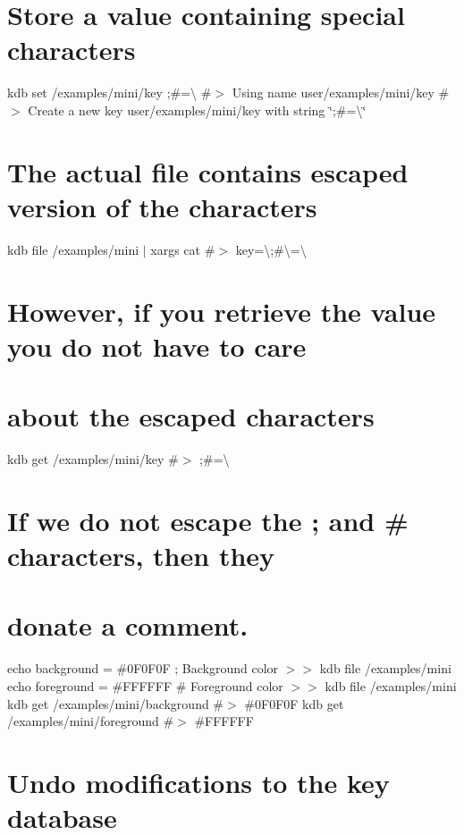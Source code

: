 \section*{Store a value containing special characters}

kdb set /examples/mini/key \textquotesingle{};\#=\textbackslash{}\textquotesingle{} \#$>$ Using name user/examples/mini/key \#$>$ Create a new key user/examples/mini/key with string \char`\"{};\#=\textbackslash{}\char`\"{}

\section*{The actual file contains escaped version of the characters}

kdb file /examples/mini $\vert$ xargs cat \#$>$ key=\textbackslash{};\#\textbackslash{}=\textbackslash{}

\section*{However, if you retrieve the value you do not have to care}

\section*{about the escaped characters}

kdb get /examples/mini/key \#$>$ ;\#=\textbackslash{}

\section*{If we do not escape the {\ttfamily ;} and {\ttfamily \#} characters, then they}

\section*{donate a comment.}

echo \textquotesingle{}background = \#0\+F0\+F0F ; Background color\textquotesingle{} $>$$>$ {\ttfamily kdb file /examples/mini} echo \textquotesingle{}foreground = \#F\+F\+F\+F\+FF \# Foreground color\textquotesingle{} $>$$>$ {\ttfamily kdb file /examples/mini} kdb get /examples/mini/background \#$>$ \#0\+F0\+F0F kdb get /examples/mini/foreground \#$>$ \#\+F\+F\+F\+F\+FF

\section*{Undo modifications to the key database}

